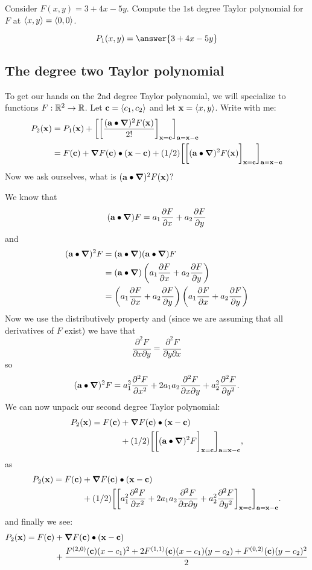 \documentclass{ximera}
\begin{document}
\begin{question}
  Consider $F(x,y)= 3+4x-5y$. Compute the $1$st degree Taylor
  polynomial for $F$ at $\vector{x,y} =\vector{0,0}$.
  \begin{prompt}
    \[
    P_1(x,y) = \answer{3+4x-5y}
    \]
  \end{prompt}
\end{question}

\subsection{The  degree two Taylor polynomial}
To get our hands on the $2$nd degree Taylor polynomial, we will
specialize to functions $F:\R^2\to\R$. Let $\vec{c}=\vector{c_1,c_2}$
and let $\vec{x} = \vector{x,y}$.  Write with me:
\begin{align*}
  P_2(\vec{x})&= P_1(\vec{x}) + \eval{\eval{\frac{(\vec{a}\dotp \grad)^2 F(\vec{x})}{2!}}_{\vec{x}=\vec{c}}}_{\vec{a}=\vec{x}-\vec{c}}\\
  &= F(\vec{c})
+ \grad F(\vec{c})\dotp (\vec{x}-\vec{c})
+(1/2)\eval{\eval{(\vec{a}\dotp \grad)^2 F(\vec{x})}_{\vec{x}=\vec{c}}}_{\vec{a}=\vec{x}-\vec{c}}
\end{align*}
Now we ask ourselves, what is $(\vec{a}\dotp \grad)^2 F(\vec{x})$?

We know that
\[
(\vec{a}\dotp\grad)F = a_1 \pp[F]{x} + a_2 \pp[F]{y}
\]
and 
\begin{align*}
(\vec{a}\dotp\grad)^2F &=(\vec{a}\dotp\grad)(\vec{a}\dotp\grad)F\\
  &= (\vec{a}\dotp\grad)\left(a_1 \pp[F]{x} + a_2 \pp[F]{y}\right)\\
  &= \left(a_1 \pp[F]{x} + a_2 \pp[F]{y}\right)\left(a_1 \pp[F]{x} + a_2 \pp[F]{y}\right)
\end{align*}
Now we use the distributively property and (since we are assuming that
all derivatives of $F$ exist) we have that
\[
\frac{\partial^2F}{\partial x\partial y}  = \frac{\partial^2F}{\partial y\partial x}
\]
so
\[
(\vec{a}\dotp\grad)^2F = a_1^2\frac{\partial^2F}{\partial x^2} + 2a_1
a_2\frac{\partial^2F}{\partial x\partial y} +
a_2^2\frac{\partial^2F}{\partial y^2}.
\]
We can now unpack our second degree Taylor polynomial:
\begin{align*}
  P_2(\vec{x})= F(\vec{c})
&+ \grad F(\vec{c})\dotp (\vec{x}-\vec{c})\\
&+(1/2)\eval{\eval{(\vec{a}\dotp\grad)^2F}_{\vec{x}=\vec{c}}}_{\vec{a}=\vec{x}-\vec{c}},
\end{align*}
as
\begin{align*}
P_2(\vec{x})=F(\vec{c})
&+ \grad F(\vec{c})\dotp (\vec{x}-\vec{c})\\
&+(1/2)\eval{\eval{a_1^2\frac{\partial^2F}{\partial x^2} + 2a_1 
a_2\frac{\partial^2F}{\partial x\partial y} +
a_2^2\frac{\partial^2F}{\partial y^2}}_{\vec{x}=\vec{c}}}_{\vec{a}=\vec{x}-\vec{c}}.
\end{align*}
and finally we see:
\begin{align*}
P_2(\vec{x})=F(\vec{c})
&+ \grad F(\vec{c})\dotp (\vec{x}-\vec{c})\\
&+\frac{F^{(2,0)}(\vec{c}) (x-c_1)^2 + 2F^{(1,1)}(\vec{c})(x-c_1)(y-c_2)  + F^{(0,2)}(\vec{c})(y-c_2)^2}{2}
\end{align*}
\end{document}
